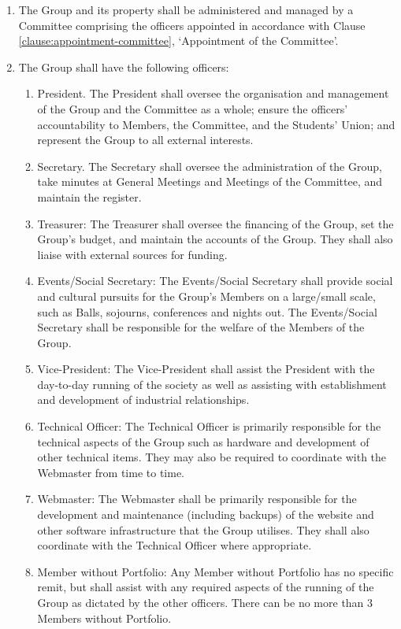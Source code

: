 \documentclass[12pt]{constitution}
\begin{document}
\begin{enumerate}
    \item The Group and its property shall be administered and managed by a Committee comprising the officers appointed in accordance with Clause \ref{clause:appointment-committee}, `Appointment of the Committee'.
    \item The Group shall have the following officers:
    \begin{enumerate}
        \item President. The President shall oversee the organisation and management of the Group and the Committee as a whole; ensure the officers' accountability to Members, the Committee, and the Students' Union; and represent the Group to all external interests.
        \item Secretary. The Secretary shall oversee the administration of the Group, take minutes at General Meetings and Meetings of the Committee, and maintain the register.
        \item Treasurer: The Treasurer shall oversee the financing of the Group, set the Group's budget, and maintain the accounts of the Group. They shall also liaise with external sources for funding.
        \item Events/Social Secretary: The Events/Social Secretary shall provide social and cultural pursuits for the Group’s Members on a large/small scale, such as Balls, sojourns, conferences and nights out. The Events/Social Secretary shall be responsible for the welfare of the Members of the Group.
        \item Vice-President: The Vice-President shall assist the President with the day-to-day running of the society as well as assisting with establishment and development of industrial relationships.
        \item Technical Officer: The Technical Officer is primarily responsible for the technical aspects of the Group such as hardware and development of other technical items. They may also be required to coordinate with the Webmaster from time to time.
        \item Webmaster: The Webmaster shall be primarily responsible for the development and maintenance (including backups) of the website and other software infrastructure that the Group utilises. They shall also coordinate with the Technical Officer where appropriate.
        \item Member without Portfolio: Any Member without Portfolio has no specific remit, but shall assist with any required aspects of the running of the Group as dictated by the other officers. There can be no more than 3 Members without Portfolio.

\end{enumerate}
\end{enumerate}
\end{document}
